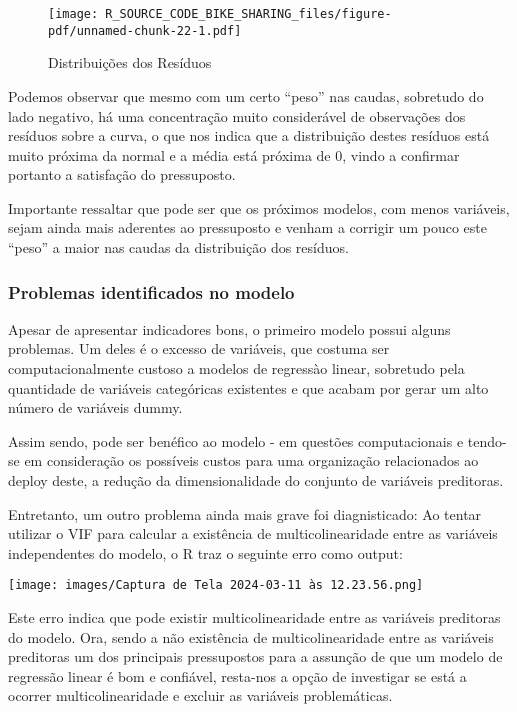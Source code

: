\documentclass[
  letterpaper,
  DIV=11,
  numbers=noendperiod]{scrartcl}
\begin{document}
\begin{figure}[H]

{\centering \texttt{[image: R\_SOURCE\_CODE\_BIKE\_SHARING\_files/figure-pdf/unnamed-chunk-22-1.pdf]}

}

\caption{Distribuições dos Resíduos}

\end{figure}%

Podemos observar que mesmo com um certo ``peso'' nas caudas, sobretudo
do lado negativo, há uma concentração muito considerável de observações
dos resíduos sobre a curva, o que nos indica que a distribuição destes
resíduos está muito próxima da normal e a média está próxima de 0, vindo
a confirmar portanto a satisfação do pressuposto.

Importante ressaltar que pode ser que os próximos modelos, com menos
variáveis, sejam ainda mais aderentes ao pressuposto e venham a corrigir
um pouco este ``peso'' a maior nas caudas da distribuição dos resíduos.

\subsubsection{Problemas identificados no
modelo}\label{problemas-identificados-no-modelo}

Apesar de apresentar indicadores bons, o primeiro modelo possui alguns
problemas. Um deles é o excesso de variáveis, que costuma ser
computacionalmente custoso a modelos de regressào linear, sobretudo pela
quantidade de variáveis categóricas existentes e que acabam por gerar um
alto número de variáveis dummy.

Assim sendo, pode ser benéfico ao modelo - em questões computacionais e
tendo-se em consideração os possíveis custos para uma organização
relacionados ao deploy deste, a redução da dimensionalidade do conjunto
de variáveis preditoras.

Entretanto, um outro problema ainda mais grave foi diagnisticado: Ao
tentar utilizar o VIF para calcular a existência de multicolinearidade
entre as variáveis independentes do modelo, o R traz o seguinte erro
como output:

\begin{center}
\texttt{[image: images/Captura de Tela 2024-03-11 às 12.23.56.png]}
\end{center}

Este erro indica que pode existir multicolinearidade entre as variáveis
preditoras do modelo. Ora, sendo a não existência de multicolinearidade
entre as variáveis preditoras um dos principais pressupostos para a
assunção de que um modelo de regressão linear é bom e confiável,
resta-nos a opção de investigar se está a ocorrer multicolinearidade e
excluir as variáveis problemáticas.
\end{document}
